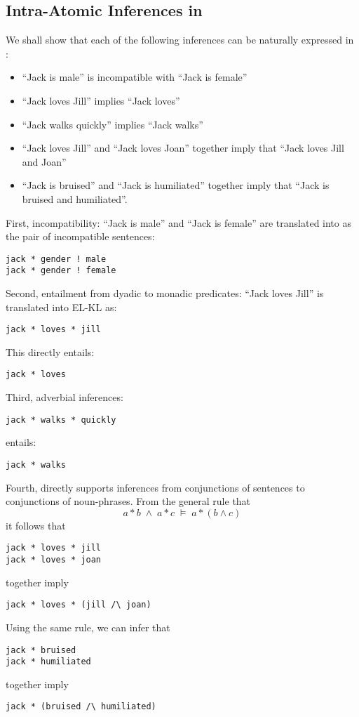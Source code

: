 \subsection{Intra-Atomic Inferences in \ELFULL{}}
We shall show that each of the following inferences can be naturally expressed in \ELKR{}:
\begin{itemize}
\item
``Jack is male'' is incompatible with ``Jack is female''
\item
``Jack loves Jill'' implies ``Jack loves''
\item
``Jack walks quickly'' implies ``Jack walks''
\item
``Jack loves Jill'' and ``Jack loves Joan'' together imply that ``Jack loves Jill and Joan''
\item
``Jack is bruised'' and ``Jack is humiliated'' together imply that ``Jack is bruised and humiliated''.
\end{itemize}
First, incompatibility: ``Jack is male'' and ``Jack is female'' are translated into \ELKR{} as the pair of incompatible sentences:
\begin{verbatim}
jack * gender ! male
jack * gender ! female
\end{verbatim}
Second, entailment from dyadic to monadic predicates:
``Jack loves Jill'' is translated into EL-KL as:
\begin{verbatim}
jack * loves * jill
\end{verbatim}
This directly entails:
\begin{verbatim}
jack * loves
\end{verbatim}
Third, adverbial inferences: 
\begin{verbatim}
jack * walks * quickly
\end{verbatim}
entails:
\begin{verbatim}
jack * walks
\end{verbatim}
Fourth, \ELKR{} directly supports inferences from conjunctions of sentences to conjunctions of noun-phrases.
From the general \ELKR{} rule that
\[
a \ast b \; \land \; a \ast c \; \models \; a \ast (b \land c)
\]
it follows that 
\begin{verbatim}
jack * loves * jill
jack * loves * joan
\end{verbatim}
together imply
\begin{verbatim}
jack * loves * (jill /\ joan)
\end{verbatim}
Using the same rule, we can infer that
\begin{verbatim}
jack * bruised
jack * humiliated
\end{verbatim}
together imply
\begin{verbatim}
jack * (bruised /\ humiliated)
\end{verbatim}
 
